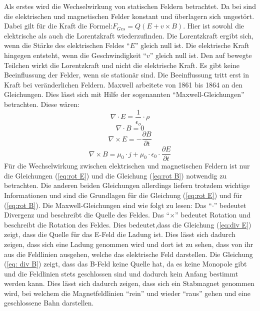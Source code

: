 Als erstes wird die Wechselwirkung von statischen Feldern betrachtet.
Da bei sind die elektrischen und magnetischen Felder konstant und überlagern sich ungestört.
Dabei gilt für die Kraft die Formel:$F_{Ges} = Q (E + v \times B)$.
Hier ist sowohl die elektrische als auch die Lorentzkraft wiederzufinden.
Die Lorentzkraft ergibt sich, wenn die Stärke des elektrischen Feldes "`$E$"' gleich null ist.
Die elektrische Kraft hingegen entsteht, wenn die Geschwindigkeit "`$v$"' gleich null ist.
Den auf bewegte Teilchen wirkt die Lorentzkraft und nicht die elektrische Kraft.
Es gibt keine Beeinflussung der Felder, wenn sie stationär sind. 
Die Beeinflussung tritt erst in Kraft bei veränderlichen Feldern.
Maxwell arbeitete von 1861 bis 1864 an den Gleichungen.
Dies lässt sich mit Hilfe der sogenannten "`Maxwell-Gleichungen"' betrachten.
Diese wären:
\begin{equation}
\label{eq:div E}
    \nabla \cdot E = \frac{1}{\epsilon_o} \cdot \rho
\end{equation}
\begin{equation}
\label{eq: div B}
    \nabla \cdot B = 0
\end{equation}
\begin{equation}
\label{eq:rot E}
    \nabla \times E = - \frac{\partial B}{\partial t}
\end{equation}
\begin{equation}
\label{eq:rot B}
    \nabla \times B = \mu_0 \cdot j + \mu_0 \cdot \epsilon_0 \cdot \frac{\partial E}{\partial t}
\end{equation}
Für die Wechselwirkung zwischen elektrischen und magnetischen Feldern ist nur die Gleichungen (\ref{eq:rot E}) und die Gleichung (\ref{eq:rot B}) notwendig zu betrachten.
Die anderen beiden Gleichungen allerdings liefern trotzdem wichtige Informationen und sind die Grundlagen für die Gleichung (\ref{eq:rot E}) und für (\ref{eq:rot B}).
Die Maxwell-Gleichungen sind wie folgt zu lesen: 
Das "`$\cdot$"' bedeutet Divergenz und beschreibt die Quelle des Feldes.
Das "`$\times$"' bedeutet Rotation und beschreibt die Rotation des Feldes.
Dies bedeutet,dass die Gleichung (\ref{eq:div E}) zeigt, dass die Quelle für das E-Feld die Ladung ist.
Dies lässt sich dadurch zeigen, dass sich eine Ladung genommen wird und dort ist zu sehen, dass von ihr aus die Feldlinien ausgehen, welche das elektrische Feld darstellen.
Die Gleichung (\ref{eq: div B}) zeigt, dass das B-Feld keine Quelle hat, da es keine Monopole gibt und die Feldlinien stets geschlossen sind und dadurch kein Anfang bestimmt werden kann.
Dies lässt sich dadurch zeigen, dass sich ein Stabmagnet genommen wird, bei welchem die Magnetfeldlinien "`rein"' und wieder "`raus"' gehen und eine geschlossene Bahn darstellen.
